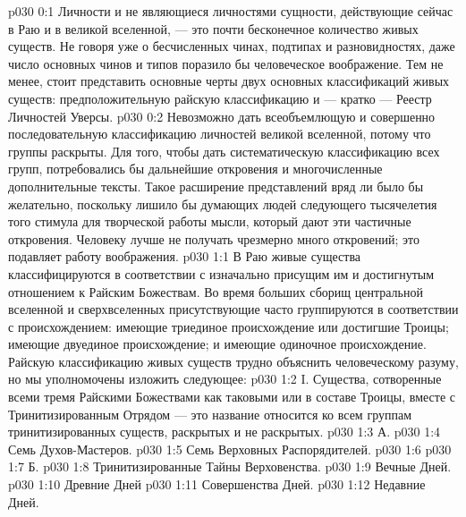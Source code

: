 \author{Могучий Вестник}
\vs p030 0:1 Личности и не являющиеся личностями сущности, действующие сейчас в Раю и в великой вселенной, --- это почти бесконечное количество живых существ. Не говоря уже о бесчисленных чинах, подтипах и разновидностях, даже число основных чинов и типов поразило бы человеческое воображение. Тем не менее, стоит представить основные черты двух основных классификаций живых существ: предположительную райскую классификацию и --- кратко --- Реестр Личностей Уверсы.
\vs p030 0:2 Невозможно дать всеобъемлющую и совершенно последовательную классификацию личностей великой вселенной, потому что  группы раскрыты. Для того, чтобы дать систематическую классификацию всех групп, потребовались бы дальнейшие откровения и многочисленные дополнительные тексты. Такое расширение представлений вряд ли было бы желательно, поскольку лишило бы думающих людей следующего тысячелетия того стимула для творческой работы мысли, который дают эти частичные откровения. Человеку лучше не получать чрезмерно много откровений; это подавляет работу воображения.
\vs p030 1:1 В Раю живые существа классифицируются в соответствии с изначально присущим им и достигнутым отношением к Райским Божествам. Во время больших сборищ центральной вселенной и сверхвселенных присутствующие часто группируются в соответствии с происхождением: имеющие триединое происхождение или достигшие Троицы; имеющие двуединое происхождение; и имеющие одиночное происхождение. Райскую классификацию живых существ трудно объяснить человеческому разуму, но мы уполномочены изложить следующее:
\vs p030 1:2 \pc I.  Существа, сотворенные всеми тремя Райскими Божествами как таковыми или в составе Троицы, вместе с Тринитизированным Отрядом --- это название относится ко всем группам тринитизированных существ, раскрытых и не раскрытых.
\vs p030 1:3 \pc А. 
\vs p030 1:4 \bibnobreakspace Семь Духов\hyp{}Мастеров.
\vs p030 1:5 \bibnobreakspace Семь Верховных Распорядителей.
\vs p030 1:6 \bibnobreakspace {}
\vs p030 1:7 \pc Б. 
\vs p030 1:8 \bibnobreakspace Тринитизированные Тайны Верховенства.
\vs p030 1:9 \bibnobreakspace Вечные Дней.
\vs p030 1:10 \bibnobreakspace Древние Дней
\vs p030 1:11 \bibnobreakspace Совершенства Дней.
\vs p030 1:12 \bibnobreakspace Недавние Дней.
